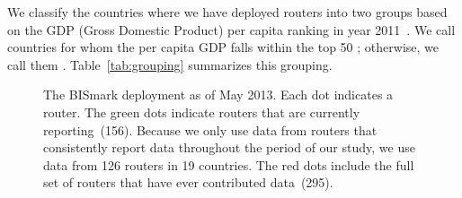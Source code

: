 We classify the countries where we have deployed routers into two groups based
on the GDP (Gross Domestic Product) per capita ranking in year
2011~\cite{www-gdp}.  We call countries for whom the per capita GDP falls
within the top 50 {\em \developed{}}; otherwise, we call them {\em \developing{}}. Table~\ref{tab:grouping}
summarizes this grouping.

\begin{figure}[t!]
 \begin{center}
\caption{The BISmark deployment as of May 2013.  Each dot indicates a
  router.  The green dots indicate routers that are currently
  reporting~(156).  Because we only use data from routers that
  consistently report data throughout the period of our study, we use
  data from 126 routers in 19 countries.  The red dots include the
  full set of routers that have ever contributed
  data~(295).}\label{fig:bismark-deployment-map}
\end{center}
\end{figure}


